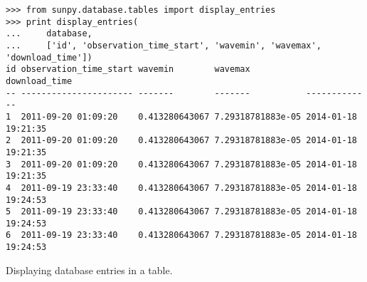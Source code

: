\begin{listing}[H]
\begin{verbatim}
>>> from sunpy.database.tables import display_entries
>>> print display_entries(
...     database,
...     ['id', 'observation_time_start', 'wavemin', 'wavemax', 'download_time'])
id observation_time_start wavemin        wavemax           download_time      
-- ---------------------- -------        -------           -------------      
1  2011-09-20 01:09:20    0.413280643067 7.29318781883e-05 2014-01-18 19:21:35
2  2011-09-20 01:09:20    0.413280643067 7.29318781883e-05 2014-01-18 19:21:35
3  2011-09-20 01:09:20    0.413280643067 7.29318781883e-05 2014-01-18 19:21:35
4  2011-09-19 23:33:40    0.413280643067 7.29318781883e-05 2014-01-18 19:24:53
5  2011-09-19 23:33:40    0.413280643067 7.29318781883e-05 2014-01-18 19:24:53
6  2011-09-19 23:33:40    0.413280643067 7.29318781883e-05 2014-01-18 19:24:53
\end{verbatim}
\caption{Displaying database entries in a table.}
\label{code:db_2}
\end{listing}

